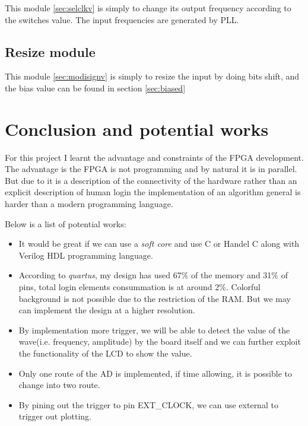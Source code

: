 \documentclass[11pt]{scrartcl}
\begin{document}
This module \ref{sec:selclkv} is simply to change its output frequency according to the switches value. The input frequencies are generated by PLL. 

\subsection{Resize module}

This module \ref{sec:modisignv} is simply to resize the input by doing bits shift, and the bias value can be found in section \ref{sec:biased}

\section{Conclusion and potential works}

For this project I learnt the advantage and constraints of the FPGA development. The advantage is the FPGA is not programming and by natural it is in parallel. But due to it is a description of the connectivity of the hardware rather than an explicit description of human login the implementation of an algorithm general is harder than a modern programming language. 

Below is a list of potential works:
\begin{itemize}
\item It would be great if we can use a \textit{soft core} and use C or Handel C along with Verilog HDL programming language.

\item According to \textit{quartus}, my design has used 67\% of the memory and 31\% of pins, total login elements consummation is at around 2\%. Colorful background is not possible due to the restriction of the RAM. But we may can implement the design at a higher resolution.\\


\item By implementation more trigger, we will be able to detect the value of the wave(i.e. frequency, amplitude) by the board itself and we can further exploit the functionality of the LCD to show the value.\\

\item Only one route of the AD is implemented, if time allowing, it is possible to change into two route.\\

\item By pining out the trigger to pin EXT\_CLOCK, we can use external to trigger out plotting.
\end{itemize}
\end{document}
